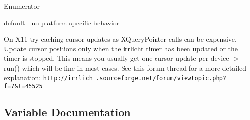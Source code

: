 \begin{Desc}
\item[Enumerator]\par
\begin{description}
\item[{\em 
E\+C\+P\+B\+\_\+\+N\+O\+NE\hypertarget{namespaceirr_1_1gui_abbd186f9cfba2f805d98248df226acefaea42899f7236957b21660fd74dda283d}{}\label{namespaceirr_1_1gui_abbd186f9cfba2f805d98248df226acefaea42899f7236957b21660fd74dda283d}
}]default -\/ no platform specific behavior \item[{\em 
E\+C\+P\+B\+\_\+\+X11\+\_\+\+C\+A\+C\+H\+E\+\_\+\+U\+P\+D\+A\+T\+ES\hypertarget{namespaceirr_1_1gui_abbd186f9cfba2f805d98248df226acefa462d7a82478e4b89a31c15fdb20bd16e}{}\label{namespaceirr_1_1gui_abbd186f9cfba2f805d98248df226acefa462d7a82478e4b89a31c15fdb20bd16e}
}]On X11 try caching cursor updates as X\+Query\+Pointer calls can be expensive. Update cursor positions only when the irrlicht timer has been updated or the timer is stopped. This means you usually get one cursor update per device-\/$>$run() which will be fine in most cases. See this forum-\/thread for a more detailed explanation\+: \href{http://irrlicht.sourceforge.net/forum/viewtopic.php?f=7&t=45525}{\tt http\+://irrlicht.\+sourceforge.\+net/forum/viewtopic.\+php?f=7\&t=45525} \end{description}
\end{Desc}


\subsection{Variable Documentation}
